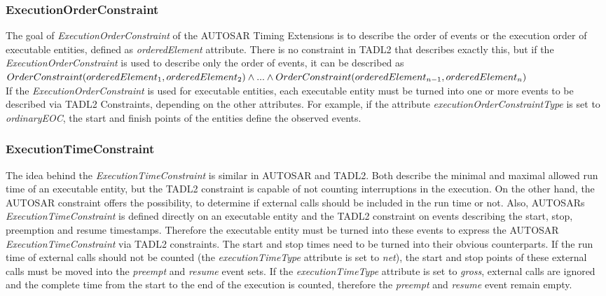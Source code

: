 	\subsubsection{ExecutionOrderConstraint}
		The goal of \emph{ExecutionOrderConstraint} of the AUTOSAR Timing Extensions is to describe the order of events or the execution order of executable entities, defined as \emph{orderedElement} attribute. There is no constraint in TADL2 that describes exactly this, but if the \emph{ExecutionOrderConstraint} is used to describe only the order of events, it can be described as \\[10pt]
		\begin{math}
			OrderConstraint(orderedElement_1, orderedElement_2)\\
			\land ... \land\\
			OrderConstraint(orderedElement_{n-1}, orderedElement_n)
		\end{math}\\[10pt]
		If the \emph{ExecutionOrderConstraint} is used for executable entities, each executable entity must be turned into one or more events to be described via TADL2 Constraints, depending on the other attributes. For example, if the attribute \emph{executionOrderConstraintType} is set to \emph{ordinaryEOC}, the start and finish points of the entities define the observed events.
		
	\subsubsection{ExecutionTimeConstraint}
		The idea behind the \emph{ExecutionTimeConstraint} is similar in AUTOSAR and TADL2. Both describe the minimal and maximal allowed run time of an executable entity, but the TADL2 constraint is capable of not counting interruptions in the execution. On the other hand, the AUTOSAR constraint offers the possibility, to determine if external calls should be included in the run time or not. Also, AUTOSARs \emph{ExecutionTimeConstraint} is defined directly on an executable entity and the TADL2 constraint on events describing the start, stop, preemption and resume timestamps. Therefore the executable entity must be turned into these events to express the AUTOSAR \emph{ExecutionTimeConstraint} via TADL2 constraints. The start and stop times need to be turned into their obvious counterparts. If the run time of external calls should not be counted (the \emph{executionTimeType} attribute is set to \emph{net}), the start and stop points of these external calls must be moved into the \emph{preempt} and \emph{resume} event sets. If the \emph{executionTimeType} attribute is set to \emph{gross}, external calls are ignored and the complete time from the start to the end of the execution is counted, therefore the \emph{preempt} and \emph{resume} event remain empty.
